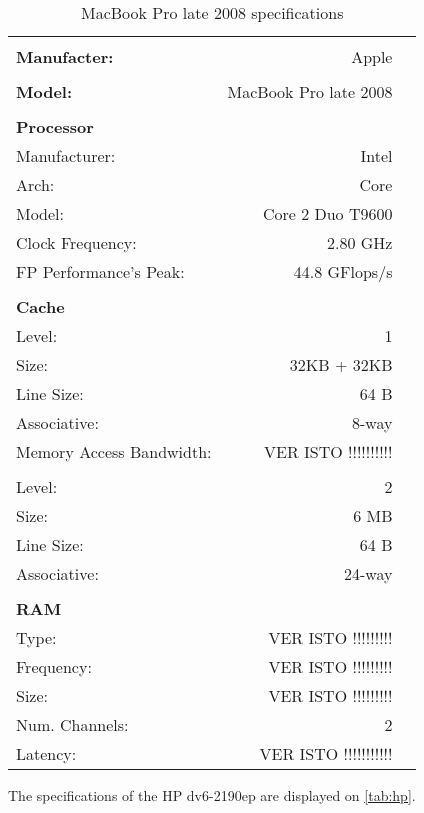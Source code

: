 \documentclass[a4paper,10pt,openright,openbib]{article}
\begin{document}
\begin{table}[!htp]
		\begin{tabular}{lrl}
			\hline \\
			\textbf{Manufacter:} & Apple \\
			\hline \\
			\textbf{Model:} & MacBook Pro late 2008 \\
			\hline \\
			\textbf{Processor} & & \\
			Manufacturer: & Intel & \\
			Arch: & Core & \\
			Model: & Core 2 Duo T9600 & \\
			Clock Frequency: & 2.80 GHz & \\
			FP Performance's Peak: & 44.8 GFlops/s & \\
			\hline \\
			\textbf{Cache} & & \\
			Level: & 1 & \\
			Size: & 32KB + 32KB & \\
			Line Size: & 64 B & \\
			Associative: & 8-way & \\
			Memory Access Bandwidth: & VER ISTO !!!!!!!!!! & \\
			\\
			Level: & 2 & \\
			Size: & 6 MB & \\
			Line Size: & 64 B & \\
			Associative: & 24-way & \\
			\hline \\
			\textbf{RAM} \\
			Type: & VER ISTO !!!!!!!!! & \\
			Frequency: & VER ISTO !!!!!!!!! & \\
			Size: & VER ISTO !!!!!!!!! & \\
			Num. Channels: & 2 & \\
			Latency: & VER ISTO !!!!!!!!!!! & \\
		\end{tabular}
		\caption{MacBook Pro late 2008 specifications}
		\label{tab:mbp}
\end{table}
The specifications of the HP dv6-2190ep are displayed on \autoref{tab:hp}. \\
\end{document}
